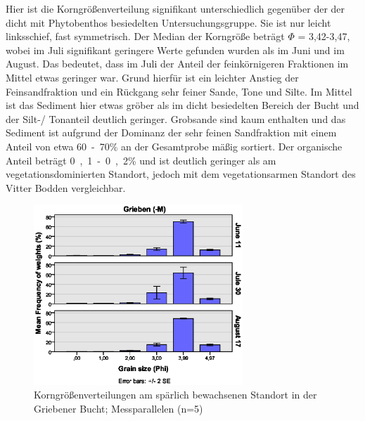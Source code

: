 Hier ist die Korngrößenverteilung signifikant unterschiedlich gegenüber der der dicht mit Phytobenthos besiedelten Untersuchungsgruppe. Sie ist nur leicht linksschief, fast symmetrisch. Der Median der Korngröße beträgt  $\Phi$ = 3,42-3,47, wobei im Juli signifikant geringere Werte gefunden wurden als im Juni und im August. Das bedeutet, dass im Juli der Anteil der feinkörnigeren Fraktionen im Mittel etwas geringer war. Grund hierfür ist ein leichter Anstieg der Feinsandfraktion und ein Rückgang sehr feiner Sande, Tone und Silte. Im Mittel ist das Sediment hier etwas gröber als im dicht besiedelten Bereich der Bucht und der Silt-/ Tonanteil deutlich geringer. Grobsande sind kaum enthalten und das Sediment ist aufgrund der Dominanz der sehr feinen Sandfraktion mit einem Anteil von etwa \unit{60-70}{\%} an der Gesamtprobe mäßig sortiert. Der organische Anteil beträgt \unit{0,1-0,2}{\%} und ist deutlich geringer als am vegetationsdominierten Standort, jedoch mit dem vegetationsarmen Standort des Vitter Bodden vergleichbar.



\begin{figure}[!htb]
\centering
\includegraphics[width=0.70\textwidth]{images/grainsize/sediment_im_jahr4.eps}
\caption[Korngrößenverteilungen Grieben (-M)]{Korngrößenverteilungen am spärlich bewachsenen Standort in der Griebener Bucht; Messparallelen (n=5)}
\label{fig:korngrössen_Grieben_-m}
\end{figure}




\FloatBarrier



